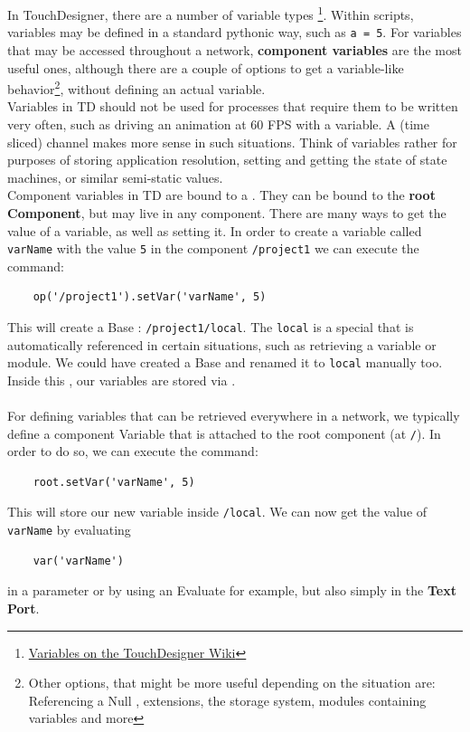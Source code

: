 In TouchDesigner, there are a number of variable types \footnote{\href{http://www.derivative.ca/wiki088/index.php?title=Variables}{Variables on the TouchDesigner Wiki}}. Within scripts, variables may be defined in a standard pythonic way, such as \verb|a = 5|. For variables that may be accessed throughout a network, \textbf{component variables} are the most useful ones, although
there are a couple of options to get a variable-like behavior\footnote{Other options, that might be more useful depending on the situation are: Referencing a
Null \CHOP, extensions, the storage system, modules containing variables and more}, without defining an actual variable.\\
Variables in TD should not be used for processes that require them to be written very often, such as driving an animation at 60 FPS with a variable. A (time sliced) \CHOP channel makes more sense in such situations. Think of variables rather for purposes of storing application resolution, setting and getting the state of state machines, or similar \glqq{}semi-static\grqq{} values.\\

Component variables in TD are bound to a \COMP. They can be bound to the \textbf{root Component}, but may live in any component. There are many ways to get the value of a variable, as well as setting it. In order to create a variable called \verb|varName|
with the value \verb|5| in the component \verb|/project1| we can execute the command:
\begin{lstlisting}
	op('/project1').setVar('varName', 5)
\end{lstlisting}

This will create a Base \COMP: \verb|/project1/local|. The \verb|local| \COMP is a special \COMP that is automatically referenced in certain situations, such as retrieving a variable or module. We could have created a Base \COMP and renamed it to \verb|local| manually too. Inside this \COMP, our variables are stored via \DATs.\\

 \missingImage \\

For defining variables that can be retrieved everywhere in a network, we typically define a component Variable that is attached to the root component (at \verb|/|). In order to do so, we can execute the command:
\begin{lstlisting}
	root.setVar('varName', 5)
\end{lstlisting}
This will store our new variable inside \verb|/local|. We can now get the value of \verb|varName| by evaluating
\begin{lstlisting}
	var('varName')
\end{lstlisting}
in a parameter or by using an Evaluate \DAT for example, but also simply in the \textbf{Text Port}.


